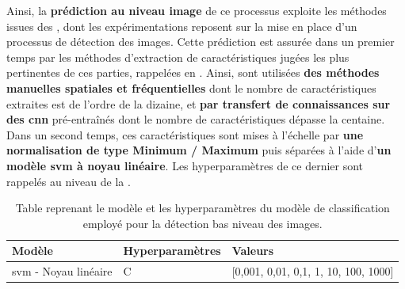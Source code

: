 Ainsi, la \textbf{prédiction au niveau image} de ce processus exploite les méthodes issues des , dont les expérimentations reposent sur la mise en place d'un processus de détection des images. Cette prédiction est assurée dans un premier temps par les méthodes d'extraction de caractéristiques jugées les plus pertinentes de ces parties, rappelées en . Ainsi, sont utilisées \textbf{des méthodes manuelles spatiales et fréquentielles} dont le nombre de caractéristiques extraites est de l'ordre de la dizaine, et \textbf{par transfert de connaissances sur des \gls{cnn}} pré-entraînés dont le nombre de caractéristiques dépasse la centaine. Dans un second temps, ces caractéristiques sont mises à l'échelle par \textbf{une normalisation de type Minimum / Maximum} puis séparées à l'aide d'\textbf{un modèle \gls{svm} à noyau linéaire}. Les hyperparamètres de ce dernier sont rappelés au niveau de la  .\par

\begin{table}[H]
    \centering
    \begin{tabular}{lll}
        \toprule
        \textbf{Modèle}                                 & \textbf{Hyperparamètres}  & \textbf{Valeurs}                          \\ \midrule
        \gls{svm} - Noyau linéaire                      & C                         & [0,001, 0,01, 0,1, 1, 10, 100, 1000]      \\ 
        \bottomrule 
    \end{tabular} 
    \caption{Table reprenant le modèle et les hyperparamètres du modèle de classification employé pour la détection bas niveau des images.}
    \label{tab:parameters_lesion_classification_image_supervised}
\end{table}\par

